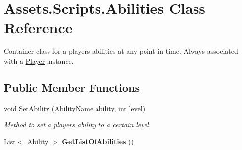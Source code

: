 \hypertarget{class_assets_1_1_scripts_1_1_abilities}{}\section{Assets.\+Scripts.\+Abilities Class Reference}
\label{class_assets_1_1_scripts_1_1_abilities}


Container class for a player\textquotesingle{}s abilities at any point in time. Always associated with a \hyperlink{class_assets_1_1_scripts_1_1_player}{Player} instance.  


\subsection*{Public Member Functions}
\begin{DoxyCompactItemize}
\item 
void \hyperlink{class_assets_1_1_scripts_1_1_abilities_ae7484501e067ff32054c162846e1774b}{Set\+Ability} (\hyperlink{namespace_assets_1_1_scripts_a105d4b16638bf60ee8e9f13a120d805b}{Ability\+Name} ability, int level)
\begin{DoxyCompactList}\small\item\em Method to set a player\textquotesingle{}s ability to a certain level. \end{DoxyCompactList}\item 
List$<$ \hyperlink{class_assets_1_1_scripts_1_1_ability}{Ability} $>$ {\bfseries Get\+List\+Of\+Abilities} ()\hypertarget{class_assets_1_1_scripts_1_1_abilities_affadf9ac101518d27ab551dd90723577}{}\label{class_assets_1_1_scripts_1_1_abilities_affadf9ac101518d27ab551dd90723577}

\end{DoxyCompactItemize}
